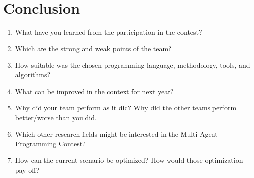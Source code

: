 \documentclass{llncs}
\begin{document}
\section{Conclusion}
\begin{enumerate}
\item What have you learned from the participation in the contest?
\item Which are the strong and weak points of the team?
\item How suitable was the chosen programming language, methodology,
  tools, and algorithms?
\item What can be improved in the context for next year?
\item Why did your team perform as it did? Why did the other teams perform better/worse than you did.
\item Which other research fields might be interested in the Multi-Agent Programming Contest?
\item How can the current scenario be optimized? How would those optimization pay off?
\end{enumerate}

{}

\end{document}
